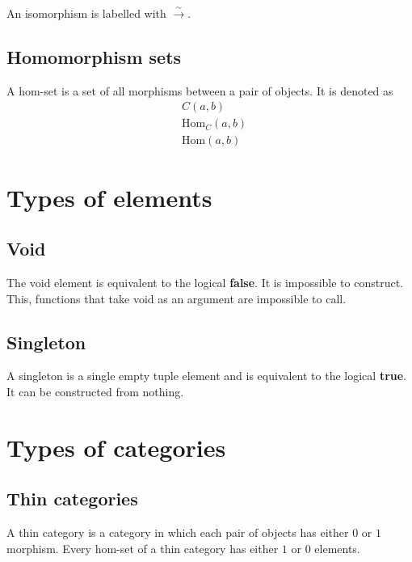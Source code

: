 \documentclass{article}
\begin{document}
An isomorphism is labelled with \(\xrightarrow{\sim}\).

\pagebreak

\subsection{Homomorphism sets} %

A hom-set is a set of all morphisms between a pair of objects.
It is denoted as
\begin{align*}
    &C(a, b) \\
    &\text{Hom}_C(a, b) \\
    &\text{Hom}(a, b)
\end{align*}

\section{Types of elements}

\subsection{Void}

The void element is equivalent to the logical \textbf{false}.
It is impossible to construct. This, functions that take void
as an argument are impossible to call.

\subsection{Singleton}

A singleton is a single empty tuple element and
is equivalent to the logical \textbf{true}. It can be constructed from nothing.


\section{Types of categories}

\subsection{Thin categories}

A thin category is a category in which each pair of objects
has either \(0\) or \(1\) morphism.
Every hom-set of a thin category has either \(1\) or \(0\) elements.
\end{document}
